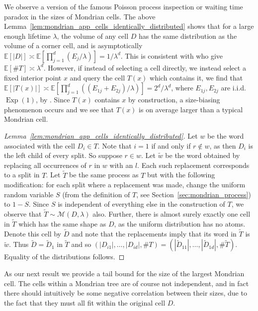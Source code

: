 \documentclass[11pt,lof]{puthesis}
\newcommand{\E}{\ensuremath{\mathbb{E}}}
\newcommand{\cM}{\ensuremath{\mathcal{M}}}
\DeclareMathOperator{\Exp}{Exp}
\theoremstyle{break}
\theoremstyle{proof}
\newtheorem{proof}{Proof}
\begin{document}
We observe a version of the famous Poisson process inspection or waiting time
paradox in the sizes of Mondrian cells. The above
Lemma~\ref{lem:mondrian_app_cells_identically_distributed} shows that for a
large enough
lifetime $\lambda$, the volume of any cell $D$ has the same distribution as the
volume of a corner cell, and is asymptotically
$\E[|D|] \asymp \E \left[ \prod_{j=1}^{d} (E_j / \lambda) \right]
= 1/\lambda^d$.
This is consistent with \citet[Proposition~2]{mourtada2020minimax} who give
$\E[\# T] \asymp \lambda^d$.
However, if instead of selecting a cell directly,
we instead select a fixed interior point $x$
and query the cell $T(x)$ which contains it, we find that
$\E[|T(x)|] \asymp \E \left[
\prod_{j=1}^{d} ((E_{1j} + E_{2j}) / \lambda) \right]
= 2^d/\lambda^d$, where $E_{1j}, E_{2j}$ are i.i.d.\ $\Exp(1)$,
by \citet[Proposition~1]{mourtada2020minimax}.
Since $T(x)$ contains $x$ by construction, a size-biasing phenomenon occurs
and we see that $T(x)$ is on average larger than a typical Mondrian cell.

\begin{proof}[Lemma~\ref{lem:mondrian_app_cells_identically_distributed}]

  Let $w$ be the word associated with the cell $D_i \in T$.
  Note that $i=1$ if and only if $r \notin w$, as then $D_i$ is the left child
  of every split.
  So suppose $r \in w$.
  Let $\tilde w$ be the word obtained by replacing all occurrences
  of $r$ in $w$ with an $l$.
  Each such replacement corresponds to a split in $T$.
  Let $\tilde T$ be the same process as $T$ but with the following
  modification: for each split where a replacement was made,
  change the uniform random variable $S$
  (from the definition of $T$, see Section~\ref{sec:mondrian_process}) to $1-S$.
  Since $S$ is independent of everything else in the construction of $T$,
  we observe that $\tilde T \sim \cM(D, \lambda)$ also.
  Further, there is almost surely exactly one cell in $\tilde T$
  which has the same shape as $D$, as the uniform distribution has no atoms.
  Denote this cell by $\tilde D$ and note that
  the replacements imply that its word in $\tilde T$
  is $\tilde w$.
  Thus $\tilde D = \tilde D_1$ in $\tilde T$ and so
  $(|D_{i1}|, \ldots, |D_{i d}|, \# T)
  = (|\tilde D_{11}|, \ldots, |\tilde D_{1d}|, \# \tilde T)$.
  Equality of the distributions follows.
\end{proof}

As our next result we provide a tail bound for the size of the largest
Mondrian cell. The cells within a Mondrian tree are of course not independent,
and in fact there should intuitively be some negative correlation between their
sizes, due to the fact that they must all fit within the original cell $D$.
\end{document}
